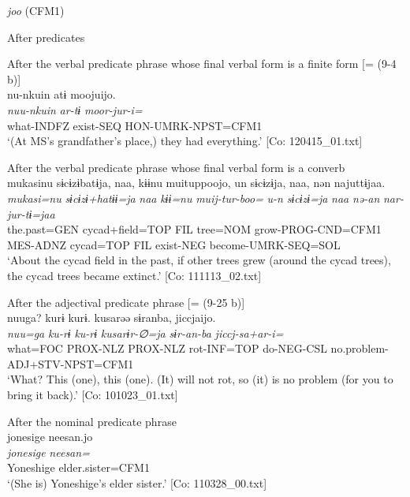 \ea\label{ex:10.88}   \textit{joo} (CFM1)\\
    \begin{xlist}
  \exi{} After predicates

  \ex  After the verbal predicate phrase whose final verbal form is a finite form [= (9-4 b)]\\
      \glll    nu-nkuin  atɨ  moojuijo.\\
      \textit{nuu-nkuin}  \textit{ar-tɨ}  \textit{moor-jur-i=}\\
      what-INDFZ  exist-SEQ  HON-UMRK-NPST=CFM1\\
      \glt       ‘(At MS’s grandfather’s place,) they had everything.’ [Co: 120415\_01.txt]

  \ex After the verbal predicate phrase whose final verbal form is a converb\\
      \glll    mukasinu  sɨcɨzɨbatɨja,  naa,  kɨɨnu  muituppoojo,  un  sɨcɨzɨja,  naa,  nən  najuttɨjaa.\\
      \textit{mukasi=nu}  \textit{sɨcɨzɨ+hatɨɨ=ja}  \textit{naa}  \textit{kɨɨ=nu}  \textit{muij-tur-boo=}     \textit{u-n}  \textit{sɨcɨzɨ=ja}  \textit{naa}  \textit{nə-an}  \textit{nar-jur-tɨ=jaa}\\
      the.past=GEN  cycad+field=TOP  FIL  tree=NOM  grow-PROG-CND=CFM1  MES-ADNZ  cycad=TOP  FIL  exist-NEG  become-UMRK-SEQ=SOL\\
      \glt       ‘About the cycad field in the past, if other trees grew (around the cycad trees), the cycad trees became extinct.’ [Co: 111113\_02.txt]

   \ex  After the adjectival predicate phrase [= (9-25 b)]\\
      \glll    nuuga?  kurɨ  kurɨ.  kusarəə  sɨranba,  jiccjaijo.\\
      \textit{nuu=ga}  \textit{ku-rɨ}  \textit{ku-rɨ}  \textit{kusarɨr-∅=ja}  \textit{sɨr-an-ba}  \textit{jiccj-sa+ar-i=}\\
      what=FOC  PROX-NLZ  PROX-NLZ  rot-INF=TOP  do-NEG-CSL  no.problem-ADJ+STV-NPST=CFM1\\
      \glt       ‘What? This (one), this (one). (It) will not rot, so (it) is no problem (for you to bring it back).’ [Co: 101023\_01.txt]

   \ex After the nominal predicate phrase\\
      \glll    jonesige  {\textbar}neesan{\textbar}.jo\\
      \textit{jonesige}  \textit{neesan=}\\
      Yoneshige  elder.sister=CFM1\\
      \glt       ‘(She is) Yoneshige’s elder sister.’ [Co: 110328\_00.txt]


\end{xlist}
